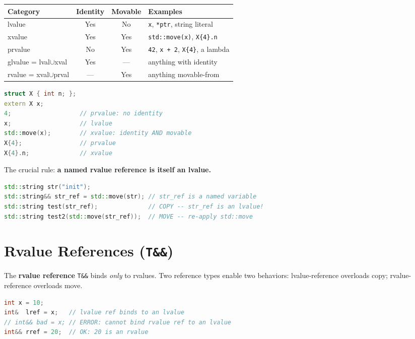 \begin{center}
\begin{tabular}{|l|c|c|l|}
\hline
\textbf{Category} & \textbf{Identity} & \textbf{Movable} & \textbf{Examples} \\
\hline
lvalue            & Yes & No  & \texttt{x}, \texttt{*ptr}, string literal \\
xvalue            & Yes & Yes & \texttt{std::move(x)}, \texttt{X\{4\}.n} \\
prvalue           & No  & Yes & \texttt{42}, \texttt{x + 2}, \texttt{X\{4\}}, a lambda \\
glvalue = lval$\cup$xval & Yes & --- & anything with identity \\
rvalue = xval$\cup$prval  & --- & Yes & anything movable-from \\
\hline
\end{tabular}
\end{center}

\begin{lstlisting}[language=C++, caption={classifying expressions}]
struct X { int n; };
extern X x;
4;                   // prvalue: no identity
x;                   // lvalue
std::move(x);        // xvalue: identity AND movable
X{4};                // prvalue
X{4}.n;              // xvalue
\end{lstlisting}

The crucial rule: \textbf{a named rvalue reference is itself an lvalue.}

\begin{lstlisting}[language=C++, caption={a named rvalue reference is an lvalue}]
std::string str("init");
std::string&& str_ref = std::move(str); // str_ref is a named variable
std::string test(str_ref);              // COPY -- str_ref is an lvalue!
std::string test2(std::move(str_ref));  // MOVE -- re-apply std::move
\end{lstlisting}

\section{Rvalue References (\texttt{T\&\&})}

The \textbf{rvalue reference} \texttt{T\&\&} binds \emph{only} to rvalues. Two reference types enable two behaviors: lvalue-reference overloads copy; rvalue-reference overloads move.

\begin{lstlisting}[language=C++, caption={rvalue references bind only to rvalues}]
int x = 10;
int&  lref = x;   // lvalue ref binds to an lvalue
// int&& bad = x; // ERROR: cannot bind rvalue ref to an lvalue
int&& rref = 20;  // OK: 20 is an rvalue
\end{lstlisting}

